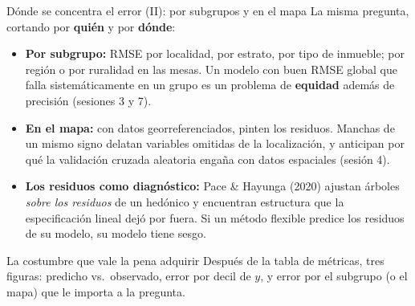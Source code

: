 \documentclass{beamer}
\newcommand{\1}{\mathbb{I}}
\begin{document}
\begin{frame}{Dónde se concentra el error (II): por subgrupos y en el mapa}
\small
La misma pregunta, cortando por \textbf{quién} y por \textbf{dónde}:
\pause
\begin{itemize}\itemsep5pt
  \item \textbf{Por subgrupo:} RMSE por localidad, por estrato, por tipo de inmueble; por región o por ruralidad en las mesas. Un modelo con buen RMSE global que falla sistemáticamente en un grupo es un problema de \textbf{equidad} además de precisión (sesiones 3 y 7). \pause
  \item \textbf{En el mapa:} con datos georreferenciados, pinten los residuos. Manchas de un mismo signo delatan variables omitidas de la localización, y anticipan por qué la validación cruzada aleatoria engaña con datos espaciales (sesión 4). \pause
  \item \textbf{Los residuos como diagnóstico:} Pace \& Hayunga (2020) ajustan árboles \emph{sobre los residuos} de un hedónico y encuentran estructura que la especificación lineal dejó por fuera. Si un método flexible predice los residuos de su modelo, su modelo tiene sesgo. \pause
\end{itemize}
\begin{block}{La costumbre que vale la pena adquirir}
Después de la tabla de métricas, tres figuras: predicho vs.\ observado, error por decil de $y$, y error por el subgrupo (o el mapa) que le importa a la pregunta.
\end{block}
\end{frame}
\end{document}
